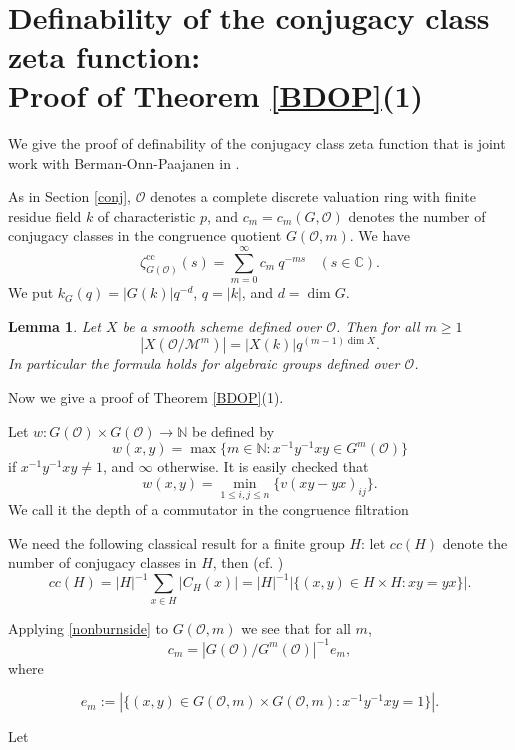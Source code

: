 \documentclass[12pt]{amsart}
\def\C{\mathbb{C}}
\def\cc{\mathrm{cc}}
\def\ra{\longrightarrow}
\def\N{\mathbb{N}}
\def\C{\mathbb{C}}
\def\cM{\mathcal M}
\def\cO{\mathcal{O}}
\newtheorem{lemma}{Lemma}[section]
\numberwithin{equation}{section}
\begin{document}
\

\section{\bf Definability of the conjugacy class zeta function: \\ Proof of Theorem \ref{BDOP}(1)}\label{def-conj}
We give the proof of definability of the conjugacy class zeta function that is joint work with Berman-Onn-Paajanen in \cite{BDOP}. 

As in Section \ref{conj}, $\cO$ denotes a complete discrete valuation ring with finite residue field $k$ of characteristic $p$, and $c_m=c_m(G,\cO)$ denotes the number of conjugacy classes in the congruence quotient $G(\cO, m)$. We have  
\begin{equation}
\zeta^{\cc}_{G(\cO)}(s)=\sum_{m=0}^{\infty} c_m~ q^{-m s}\ \ \ \
(s\in\C).
\end{equation}
We put $k_G(q)=|G(k)|q^{-d}$, $q=|k|$, and $d=\dim G$.

\begin{lemma}\cite{BDOP}\label{lemma-index-dimension-formula}
Let $X$ be a smooth scheme defined over $\cO$. Then
for all $m\geq 1$
\[
|X(\cO/\cM^m)|=|X(k)|q^{(m-1)\dim X}.
\]
In particular the formula holds for algebraic groups defined over $\cO$.

\end{lemma}

Now we give a proof of Theorem \ref{BDOP}(1).

Let $w: G(\cO)\times G(\cO)\ra \N$ be defined by 
$$w(x,y)=\max\{m\in\N: x^{-1}y^{-1}xy\in G^m(\cO)\}$$ if
$x^{-1}y^{-1}xy\neq 1$, and $\infty$ otherwise. It is
easily checked that $$w(x,y)=\min_{1\leq i,j\leq
n}\{v(xy-yx)_{ij}\}.$$
We call it the depth of a commutator in the congruence filtration

We need the following classical result for a finite group $H$: let $cc(H)$ denote the number of conjugacy classes in $H$,
then (cf. \cite{ds-conj})
\begin{equation}\label{nonburnside}
cc(H)=|H|^{-1}\sum_{x\in H} |C_H(x)|= |H|^{-1}|\{(x,y)\in H\times H:xy=yx  \}|.
\end{equation}

Applying \eqref{nonburnside} to $G(\cO,m)$ we see that for
all $m$, 
$$c_m=|G(\cO)/G^m(\cO)|^{-1}e_m,$$ 
where

\[e_m:=|\{({x},{y})\in G( \cO,m)\times G(\cO,m):
{x}^{-1}y^{-1}xy=1\}|.\]

Let
\end{document}

